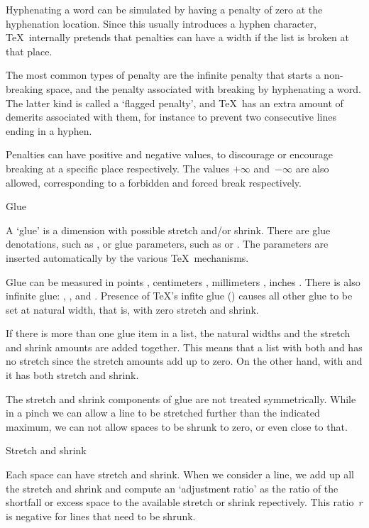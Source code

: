 Hyphenating a word can be simulated by having a penalty of zero at the
hyphenation location. Since this usually introduces a hyphen
character, \TeX\ internally pretends that penalties can have a width
if the list is broken at that place.

The most common types of penalty are the infinite penalty that starts
a non-breaking space, and the penalty associated with breaking by
hyphenating a word. The latter kind is called a `flagged penalty', and
\TeX\ has an extra amount of demerits associated with them, for
instance to prevent two consecutive lines ending in a hyphen.

Penalties can have positive and negative values, to discourage or
encourage breaking at a specific place respectively. The values
$+\infty$ and~$-\infty$ are also allowed, corresponding to a forbidden
and forced break respectively.

 {Glue}

A `glue' is a dimension with possible stretch and/or shrink. There are
glue denotations, such as , or glue
parameters, such as  or . The
parameters are inserted automatically by the various \TeX\ mechanisms.

Glue can be measured in points , centimeters , millimeters
, inches . There is also infinite glue: , ,
and .
Presence of \TeX's infite glue
() causes all other glue to be set at natural width, that is,
with zero stretch and shrink. 

If there is more than one glue item in a list, the natural widths and
the stretch and shrink amounts are added together. This means that a
list with both  and  has no stretch
since the stretch amounts add up to zero.
On the other hand, with  and  it has
both stretch and shrink.

The stretch and shrink components of glue are not treated
symmetrically. While in a pinch we can allow a line to be stretched
further than the indicated maximum, we can not allow spaces to be
shrunk to zero, or even close to that. 

 {Stretch and shrink}

Each space can have stretch and shrink. When we consider a line, we
add up all the stretch and shrink and compute an `adjustment ratio' as
the ratio of the shortfall or excess space to the available stretch or
shrink repectively. This ratio~$r$ is negative for lines that need to be
shrunk.

